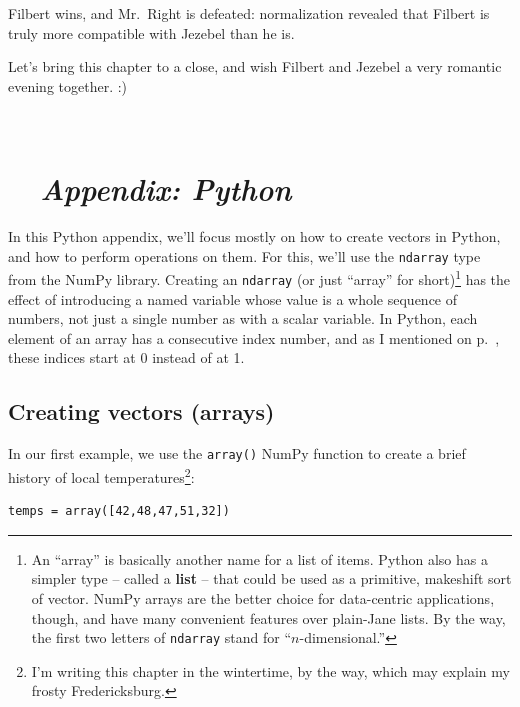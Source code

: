 \normalsize
Filbert wins, and Mr.~Right is defeated: normalization revealed that
Filbert is truly more compatible with Jezebel than he is.

\label{matchmakerGameTheSystemEnd}
Let's bring this chapter to a close, and wish Filbert and Jezebel a very
romantic evening together. :)

\hrulefill \\

\pagebreak

\section*{\faPython \ \ \textit{Appendix: Python}}



In this Python appendix, we'll focus mostly on how to create vectors in Python,
and how to perform operations on them. For this, we'll use the \texttt{ndarray}
type from the NumPy library. Creating an \texttt{ndarray} (or just ``array''
for short)\footnote{An ``array'' is basically another name for a list of items.
Python also has a simpler type -- called a \textbf{list} -- that could be used
as a primitive, makeshift sort of vector. NumPy arrays are the better choice
for data-centric applications, though, and have many convenient features over
plain-Jane lists. By the way, the first two letters of \texttt{ndarray} stand
for ``$n$-dimensional.''} has the effect of introducing a named variable whose
value is a whole sequence of numbers, not just a single number as with a scalar
variable. In Python, each element of an array has a consecutive index number,
and as I mentioned on p.~\pageref{PythonStartsAtZero}, these indices start at 0
instead of at 1.

\subsection*{Creating vectors (arrays)}

In our first example, we use the \texttt{array()} NumPy function to create a
brief history of local temperatures\footnote{I'm writing this chapter in the
wintertime, by the way, which may explain my frosty Fredericksburg.}:

\vspace{-.1in}
\begin{Verbatim}[fontsize=\small,samepage=true,frame=single,framesep=3mm]
temps = array([42,48,47,51,32])
\end{Verbatim}
\vspace{-.15in}


